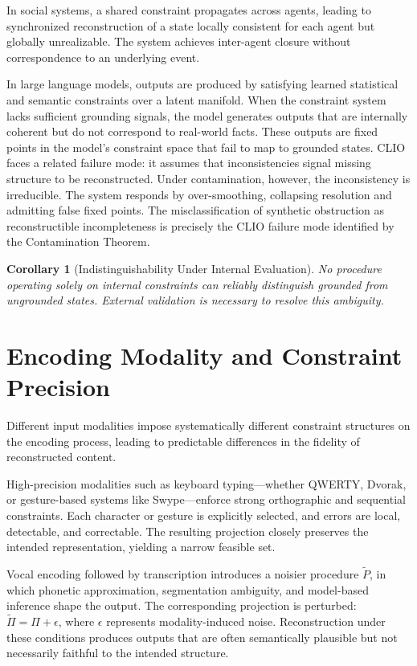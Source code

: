 \documentclass[12pt, letterpaper]{article}
\theoremstyle{flyxion}
\newtheorem{corollary}[theorem]{Corollary}
\begin{document}
In social systems, a shared constraint propagates across agents, leading to synchronized reconstruction of a state locally consistent for each agent but globally unrealizable. The system achieves inter-agent closure without correspondence to an underlying event.

In large language models, outputs are produced by satisfying learned statistical and semantic constraints over a latent manifold. When the constraint system lacks sufficient grounding signals, the model generates outputs that are internally coherent but do not correspond to real-world facts. These outputs are fixed points in the model's constraint space that fail to map to grounded states. CLIO faces a related failure mode: it assumes that inconsistencies signal missing structure to be reconstructed. Under contamination, however, the inconsistency is irreducible. The system responds by over-smoothing, collapsing resolution and admitting false fixed points. The misclassification of synthetic obstruction as reconstructible incompleteness is precisely the CLIO failure mode identified by the Contamination Theorem.

\begin{corollary}[Indistinguishability Under Internal Evaluation]
No procedure operating solely on internal constraints can reliably distinguish grounded from ungrounded states. External validation is necessary to resolve this ambiguity.
\end{corollary}

\section{Encoding Modality and Constraint Precision}

Different input modalities impose systematically different constraint structures on the encoding process, leading to predictable differences in the fidelity of reconstructed content.

High-precision modalities such as keyboard typing---whether QWERTY, Dvorak, or gesture-based systems like Swype---enforce strong orthographic and sequential constraints. Each character or gesture is explicitly selected, and errors are local, detectable, and correctable. The resulting projection closely preserves the intended representation, yielding a narrow feasible set.

Vocal encoding followed by transcription introduces a noisier procedure $\tilde{P}$, in which phonetic approximation, segmentation ambiguity, and model-based inference shape the output. The corresponding projection is perturbed: $\tilde{\Pi} = \Pi + \epsilon$, where $\epsilon$ represents modality-induced noise. Reconstruction under these conditions produces outputs that are often semantically plausible but not necessarily faithful to the intended structure.
\end{document}
